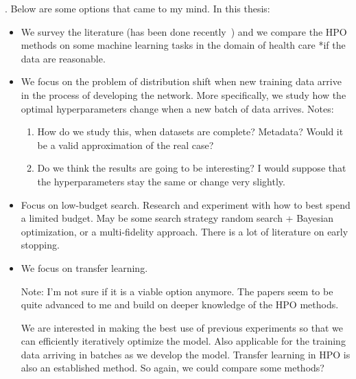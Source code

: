 . Below are some options that came to my mind. In this thesis:
\begin{itemize}
    \item We survey the literature (has been done recently~\cite{survey2020}\cite{survey2021}) and we compare the HPO methods on some machine learning tasks in the domain of health care *if the data are reasonable.
    \item We focus on the problem of distribution shift when new training data arrive in the process of developing the network. More specifically, we study how the optimal hyperparameters change when a new batch of data arrives. Notes:
    \begin{enumerate}
        \item How do we study this, when datasets are complete? Metadata? Would it be a valid approximation of the real case?
        \item Do we think the results are going to be interesting? I would suppose that the hyperparameters stay the same or change very slightly.
    \end{enumerate}
    \item Focus on low-budget search. Research and experiment with how to best spend a limited budget. May be some search strategy random search + Bayesian optimization, or a multi-fidelity approach. There is a lot of literature on early stopping.
    \item We focus on transfer learning.

    Note: I'm not sure if it is a viable option anymore. The papers seem to be quite advanced to me and build on deeper knowledge of the HPO methods.

    We are interested in making the best use of previous experiments so that we can efficiently iteratively optimize the model. Also applicable for the training data arriving in batches as we develop the model. Transfer learning in HPO is also an established method. So again, we could compare some methods?
\end{itemize}



